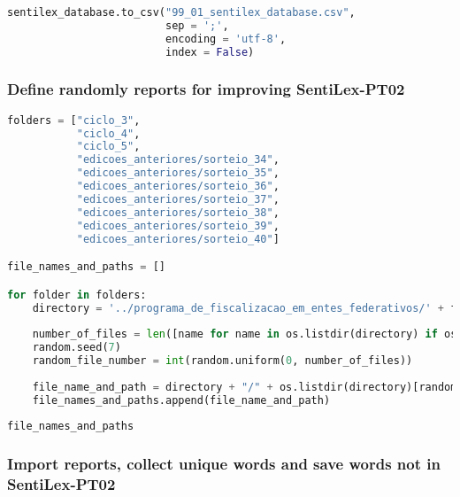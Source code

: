 \begin{lstlisting}[language=Python]
sentilex_database.to_csv("99_01_sentilex_database.csv",
                         sep = ';',
                         encoding = 'utf-8',
                         index = False)
\end{lstlisting}

\hypertarget{define-randomly-reports-for-improving-sentilex-pt02}{%
\subsubsection{Define randomly reports for improving
SentiLex-PT02}\label{define-randomly-reports-for-improving-sentilex-pt02}}

\begin{lstlisting}[language=Python]
folders = ["ciclo_3",
           "ciclo_4",
           "ciclo_5",
           "edicoes_anteriores/sorteio_34",
           "edicoes_anteriores/sorteio_35",
           "edicoes_anteriores/sorteio_36",
           "edicoes_anteriores/sorteio_37",
           "edicoes_anteriores/sorteio_38",
           "edicoes_anteriores/sorteio_39",
           "edicoes_anteriores/sorteio_40"]

file_names_and_paths = []

for folder in folders:
    directory = '../programa_de_fiscalizacao_em_entes_federativos/' + folder
    
    number_of_files = len([name for name in os.listdir(directory) if os.path.isfile(os.path.join(directory, name))]) - 3
    random.seed(7)
    random_file_number = int(random.uniform(0, number_of_files))
    
    file_name_and_path = directory + "/" + os.listdir(directory)[random_file_number]
    file_names_and_paths.append(file_name_and_path)
    
file_names_and_paths
\end{lstlisting}

\hypertarget{import-reports-collect-unique-words-and-save-words-not-in-sentilex-pt02}{%
\subsubsection{Import reports, collect unique words and save words not
in
SentiLex-PT02}\label{import-reports-collect-unique-words-and-save-words-not-in-sentilex-pt02}}

